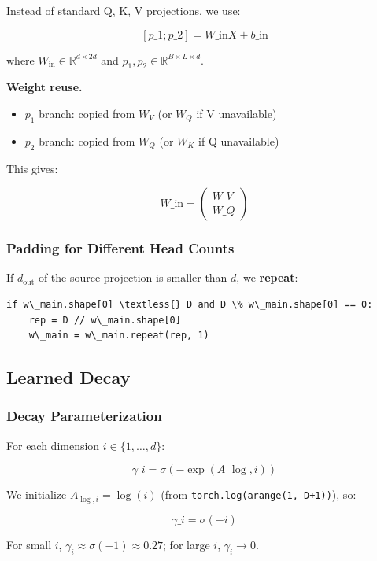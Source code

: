 Instead of standard Q, K, V projections, we use:

\[
[p\_1; p\_2] = W\_\text{in} X + b\_\text{in}
\tag{4.1}
\]

where $W_\text{in} \in \mathbb{R}^{d \times 2d}$ and $p_1, p_2 \in \mathbb{R}^{B \times L \times d}$.

\textbf{Weight reuse.}

\begin{itemize}
\item $p_1$ branch: copied from $W_V$ (or $W_Q$ if V unavailable)
\item $p_2$ branch: copied from $W_Q$ (or $W_K$ if Q unavailable)

\end{itemize}
This gives:

\[
W\_\text{in} = \begin{pmatrix} W\_V \\ W\_Q \end{pmatrix}
\tag{4.2}
\]

\subsubsection{Padding for Different Head Counts}

If $d_\text{out}$ of the source projection is smaller than $d$, we \textbf{repeat}:

\begin{lstlisting}
if w\_main.shape[0] \textless{} D and D \% w\_main.shape[0] == 0:
    rep = D // w\_main.shape[0]
    w\_main = w\_main.repeat(rep, 1)
\end{lstlisting}

\subsection{Learned Decay}

\subsubsection{Decay Parameterization}

For each dimension $i \in \{1, \dots, d\}$:

\[
\gamma\_i = \sigma(-\exp(A\_{\log, i}))
\tag{4.3}
\]

We initialize $A_{\log, i} = \log(i)$ (from \texttt{torch.log(arange(1, D+1))}), so:

\[
\gamma\_i = \sigma(-i)
\tag{4.4}
\]

For small $i$, $\gamma_i \approx \sigma(-1) \approx 0.27$; for large $i$, 
$\gamma_i \to 0$.

